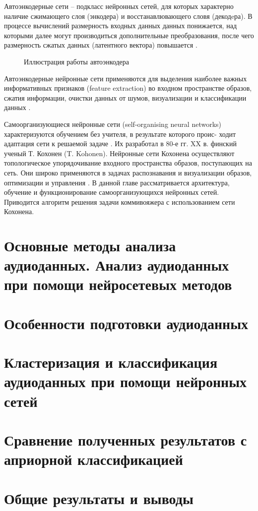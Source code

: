 Автоэнкодерные сети -- подкласс нейронных сетей, для которых характерно наличие сжимающего слоя (энкодера) и восстанавлювающего словя (декодeра).
В процессе вычислений размерность входных данных данных понижается, над которыми далее могут производиться дополнительные преобразования, 
после чего размерность сжатых данных (латентного вектора) повышается \cite{vae}.
\begin{figure}[H]
	\caption{Иллюстрация работы автоэнкодера}
\end{figure}

Автоэнкодерные нейронные сети применяются для выделения наиболее важных информативных признаков 
(feature extraction) во входном пространстве образов, сжатия информации, очистки
данных от шумов, визуализации и классификации данных \cite{bgu_krasn}.

Самоорганизующиеся нейронные сети (self-organising neural networks)
характеризуются обучением без учителя, в результате которого проис-
ходит адаптация сети к решаемой задаче . Их разработал в 80-е гг. XX в.
финский ученый Т. Кохонен (T. Kohonen). Нейронные сети
Кохонена осуществляют топологическое упорядочивание входного
пространства образов, поступающих на сеть. Они широко применяются
в задачах распознавания и визуализации образов, оптимизации и
управления . В данной главе рассматривается архитектура, обучение и
функционирование самоорганизующихся нейронных сетей. Приводится алгоритм решения задачи коммивояжера с использованием сети Кохонена.

\chapter{Основные методы анализа аудиоданных. Анализ аудиоданных при помощи нейросетевых методов}
\chapter{Особенности подготовки аудиоданных}
\chapter{Кластеризация и классификация аудиоданных при помощи нейронных сетей}
\chapter{Сравнение полученных результатов с априорной классификацией}
\chapter{Общие результаты и выводы}